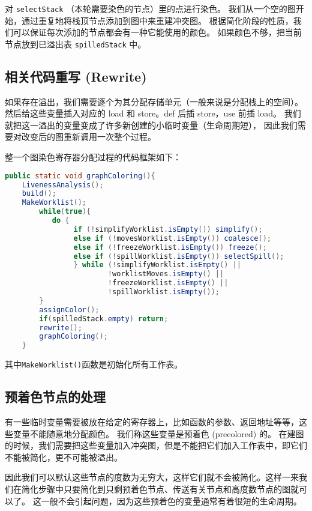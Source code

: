 对 \texttt{selectStack} （本轮需要染色的节点）里的点进行染色。
我们从一个空的图开始，通过重复地将栈顶节点添加到图中来重建冲突图。
根据简化阶段的性质，我们可以保证每次添加的节点都会有一种它能使用的颜色。
如果颜色不够，把当前节点放到已溢出表 \texttt{spilledStack} 中。

\subsection{相关代码重写 (Rewrite)}

如果存在溢出，我们需要逐个为其分配存储单元（一般来说是分配栈上的空间）。
然后给这些变量插入对应的 load 和 store。def 后插 store，use 前插 load。
我们就把这一溢出的变量变成了许多新创建的小临时变量（生命周期短），
因此我们需要对改变后的图重新调用一次整个过程。

整一个图染色寄存器分配过程的代码框架如下：
\begin{lstlisting}[language=java]
    public static void graphColoring(){
    LivenessAnalysis();    
    build();
    MakeWorklist();
        while(true){
           do {
                if (!simplifyWorklist.isEmpty()) simplify();
                else if (!movesWorklist.isEmpty()) coalesce();
                else if (!freezeWorklist.isEmpty()) freeze();
                else if (!spillWorklist.isEmpty()) selectSpill();
                } while (!simplifyWorklist.isEmpty() ||
                        !worklistMoves.isEmpty() ||
                        !freezeWorklist.isEmpty() ||
                        !spillWorklist.isEmpty());
        }
        assignColor();
        if(spilledStack.empty) return;
        rewrite();
        graphColoring();
    }
\end{lstlisting}

其中\texttt{MakeWorklist()}函数是初始化所有工作表。

\subsection{预着色节点的处理}

有一些临时变量需要被放在给定的寄存器上，比如函数的参数、返回地址等等，这些变量不能随意地分配颜色。
我们称这些变量是预着色 (precolored) 的。
在建图的时候，我们需要把这些变量加入冲突图，但是不能把它们加入工作表中，即它们不能被简化，更不可能被溢出。

因此我们可以默认这些节点的度数为无穷大，这样它们就不会被简化。这样一来我们在简化步骤中只要简化到只剩预着色节点、传送有关节点和高度数节点的图就可以了。
这一般不会引起问题，因为这些预着色的变量通常有着很短的生命周期。
